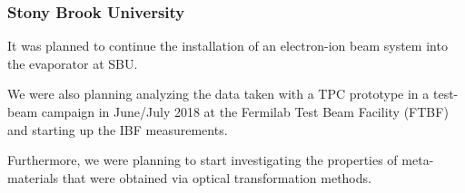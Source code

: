 \subsubsection{Stony Brook University} 
It was planned to continue the installation of an electron-ion beam system into the evaporator at SBU.

We were also planning analyzing the data taken with a TPC prototype in a test-beam campaign in June/July 2018 at the Fermilab Test Beam Facility (FTBF) and starting up the IBF measurements.

Furthermore, we were planning to start investigating the properties of meta-materials that were obtained via optical transformation methods.